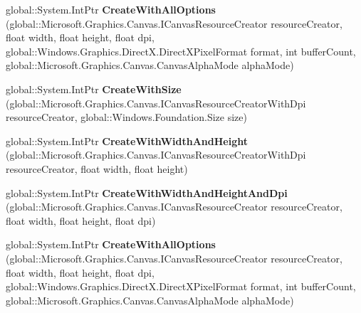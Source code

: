 \begin{DoxyCompactItemize}
global\+::\+System.\+Int\+Ptr {\bfseries Create\+With\+All\+Options} (global\+::\+Microsoft.\+Graphics.\+Canvas.\+I\+Canvas\+Resource\+Creator resource\+Creator, float width, float height, float dpi, global\+::\+Windows.\+Graphics.\+Direct\+X.\+Direct\+X\+Pixel\+Format format, int buffer\+Count, global\+::\+Microsoft.\+Graphics.\+Canvas.\+Canvas\+Alpha\+Mode alpha\+Mode)
\item 
\mbox{\label{interface_microsoft_1_1_graphics_1_1_canvas_1_1_i_canvas_swap_chain_factory_a80f024e2b5c57fefb1507afbe4bd54cc}} 
global\+::\+System.\+Int\+Ptr {\bfseries Create\+With\+Size} (global\+::\+Microsoft.\+Graphics.\+Canvas.\+I\+Canvas\+Resource\+Creator\+With\+Dpi resource\+Creator, global\+::\+Windows.\+Foundation.\+Size size)
\item 
\mbox{\label{interface_microsoft_1_1_graphics_1_1_canvas_1_1_i_canvas_swap_chain_factory_a2adbd2e8ccc7fda2470b0e91e8d58ca7}} 
global\+::\+System.\+Int\+Ptr {\bfseries Create\+With\+Width\+And\+Height} (global\+::\+Microsoft.\+Graphics.\+Canvas.\+I\+Canvas\+Resource\+Creator\+With\+Dpi resource\+Creator, float width, float height)
\item 
\mbox{\label{interface_microsoft_1_1_graphics_1_1_canvas_1_1_i_canvas_swap_chain_factory_abec837948f196cc09791ba957885b690}} 
global\+::\+System.\+Int\+Ptr {\bfseries Create\+With\+Width\+And\+Height\+And\+Dpi} (global\+::\+Microsoft.\+Graphics.\+Canvas.\+I\+Canvas\+Resource\+Creator resource\+Creator, float width, float height, float dpi)
\item 
\mbox{\label{interface_microsoft_1_1_graphics_1_1_canvas_1_1_i_canvas_swap_chain_factory_ab3ef9c019b3b37be03ba50236075ba58}} 
global\+::\+System.\+Int\+Ptr {\bfseries Create\+With\+All\+Options} (global\+::\+Microsoft.\+Graphics.\+Canvas.\+I\+Canvas\+Resource\+Creator resource\+Creator, float width, float height, float dpi, global\+::\+Windows.\+Graphics.\+Direct\+X.\+Direct\+X\+Pixel\+Format format, int buffer\+Count, global\+::\+Microsoft.\+Graphics.\+Canvas.\+Canvas\+Alpha\+Mode alpha\+Mode)
\item 

\end{DoxyCompactItemize}
